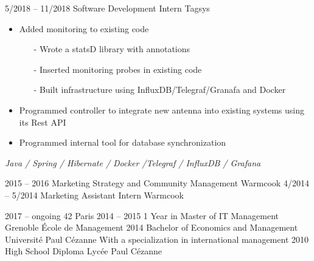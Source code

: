 \documentclass[10pt]{cv}
\begin{document}

\vspace{2mm}

\begin{entrylist}
  \entry
    {5/2018 -- 11/2018}
    {Software Development Intern}
    {Tagsys}
    {\vspace{-1ex}
      \begin{itemize}
        \item Added monitoring to existing code
        \begin{itemize}
            \item[-] Wrote a statsD library with annotations
            \item[-] Inserted monitoring probes in existing code
            \item[-] Built infrastructure using InfluxDB/Telegraf/Granafa and Docker
          \end{itemize}
          \item Programmed controller to integrate new antenna into existing systems using its Rest API
          \item Programmed internal tool for database synchronization\\
      \end{itemize}
      \vspace{-1ex}
      \textit{Java / Spring / Hibernate / Docker /Telegraf / InfluxDB / Grafana}}
  \smallentry
    {2015 -- 2016}
    {Marketing Strategy and Community Management}
    {Warmcook}
  \smallentry
    {4/2014 -- 5/2014}
    {Marketing Assistant Intern}
    {Warmcook}
\end{entrylist}


\vspace{-3mm}
\begin{entrylist}
  \smallentry
    {2017 -- ongoing}
    {42 Paris}
    {}
  \smallentry
    {2014 -- 2015}
    {1 Year in Master of IT Management}
    {Grenoble École de Management}
  \entry
    {2014}
    {Bachelor of Economics and Management}
    {Université Paul Cézanne}
    {With a specialization in international management}
  \smallentry
    {2010}
    {High School Diploma}
    {Lycée Paul Cézanne}
\end{entrylist}

\vspace{-2mm}

\end{document}
